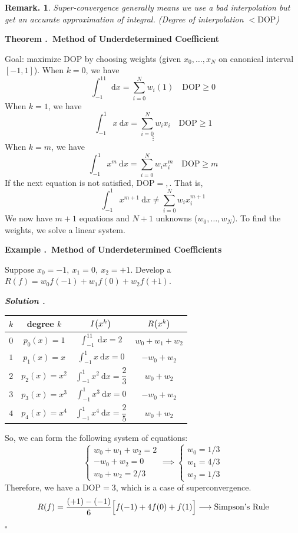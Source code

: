 \documentclass[12pt, a4paper]{article}
\newcounter{index}[subsection]
\newenvironment*{eg}[1]{\begin{framed}\par\noindent\textbf{Example \thesubsection.\stepcounter{index}\theindex\ #1} \par}{\par\end{framed}}
\newenvironment*{thm}[1]{\begin{tcolorbox}\par\noindent\textbf{Theorem \thesubsection.\stepcounter{index}\theindex\ #1} \par}{\par\end{tcolorbox}}
\newcounter{nprf}[subsection]
\newenvironment*{sol}{\par\indent\textbf{\textit{Solution \stepcounter{nprf}\thenprf.}}\par}{\hfill{$\square$}\par}
\newtheorem{rmk}{Remark.}[section]
\def\d{{\mathrm{d}}}
\def\dsst{\displaystyle}
\def\DOP{\mathrm{DOP}}
\begin{document}
\begin{rmk}Super-convergence generally means we use a bad interpolation but get an accurate approximation of integral. (Degree of interpolation $<\DOP$)\end{rmk}
\begin{thm}{Method of Underdetermined Coefficient}
	Goal: maximize $\DOP$ by choosing weights (given $x_0,\dots,x_N$ on canonical interval $[-1,1]$). When $k=0$, we have \[\int_{-1}^11\ \d{x}=\sum_{i=0}^Nw_i(1)\quad\DOP\geq0\] When $k=1$, we have \[\int_{-1}^1x\ \d{x}=\sum_{i=0}^Nw_ix_i\quad\DOP\geq1\] \[\vdots\] When $k=m$, we have \[\int_{-1}^1x^m\ \d{x}=\sum_{i=0}^Nw_ix_i^m\quad\DOP\geq m\] If the next equation is not satisfied, $\DOP=,$. That is, \[\int_{-1}^1x^{m+1}\ \d{x}\neq\sum_{i=0}^Nw_ix_i^{m+1}\] We now have $m+1$ equations and $N+1$ unknowns ($w_0,\dots,w_N$). To find the weights, we solve a linear system. 
\end{thm}
\begin{eg}{Method of Underdetermined Coefficients}
	Suppose $x_0=-1,\ x_1=0,\ x_2=+1$. Develop a $R(f)=w_0f(-1)+w_1f(0)+w_2f(+1)$.
	\begin{sol}\begin{center}\begin{tabular}{c|c|c|c}
		$k$&degree $k$&$I\qty(x^k)$&$R\qty(x^k)$\\\hline
		$0$&$p_0(x)=1$&$\dsst\int_{-1}^11\ \d{x}=2$&$w_0+w_1+w_2$\\
		$1$&$p_1(x)=x$&$\dsst\int_{-1}^1x\ \d{x}=0$&$-w_0+w_2$\\
		$2$&$p_2(x)=x^2$&$\dsst\int_{-1}^1x^2\ \d{x}=\dfrac{2}{3}$&$w_0+w_2$\\
		$3$&$p_3(x)=x^3$&$\dsst\int_{-1}^1x^3\ \d{x}=0$&$-w_0+w_2$\\
		$4$&$p_4(x)=x^4$&$\dsst\int_{-1}^1x^4\ \d{x}=\dfrac{2}{5}$&$w_0+w_2$
	\end{tabular}\end{center} So, we  can form the following system of equations: \[\begin{cases}w_0+w_1+w_2=2\\-w_0+w_2=0\\w_0+w_2=2/3\end{cases}\implies\begin{cases}w_0=1/3\\w_1=4/3\\w_2=1/3\end{cases}\] Therefore, we have a $\DOP=3$, which is a case of superconvergence. \[R(f)=\dfrac{(+1)-(-1)}{6}\qty\Big[f(-1)+4f(0)+f(1)]\longrightarrow\text{Simpson's Rule}\]\end{sol}
\end{eg}
\end{document}
